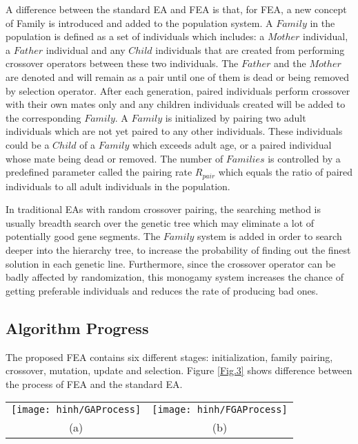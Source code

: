 \documentclass[final]{elsarticle}
\begin{document}
A difference between the standard EA and FEA is that, for FEA, a new concept of Family is introduced and added to the population system. A $ Family $ in the population is defined as a set of individuals which includes: a $ Mother $ individual, a $ Father $ individual and any $ Child $ individuals that are created from performing crossover operators between these two individuals. The $ Father $ and the $ Mother $ are denoted and will remain as a pair until one of them is dead or being removed by selection operator. After each generation, paired individuals perform crossover with their own mates only and any children individuals created will be added to the corresponding $ Family $. A $ Family $ is initialized by pairing two adult individuals which are not yet paired to any other individuals. These individuals could be a $ Child $ of a $ Family $ which exceeds adult age, or a paired individual whose mate being dead or removed. The number of $ Families $ is controlled by a predefined parameter called the pairing rate $R_{pair}$ which equals the ratio of paired individuals to all adult individuals in the population.

In traditional EAs with random crossover pairing, the searching method is usually breadth search over the genetic tree which may eliminate a lot of potentially good gene segments. The $ Family $ system is added in order to search deeper into the hierarchy tree, to increase the probability of finding out the finest solution in each genetic line. Furthermore, since the crossover operator can be badly affected by randomization, this monogamy system increases the chance of getting preferable individuals and reduces the rate of producing bad ones. 


\subsection{Algorithm Progress}

The proposed FEA contains six different stages: initialization, family pairing, crossover, mutation, update and selection. Figure \ref{Fig.3} shows difference between the process of FEA and the standard EA.
\begin{figure*}[h]
	\begin{tabular}{cc}
		\texttt{[image: hinh/GAProcess]}&\texttt{[image: hinh/FGAProcess]}\\
		(a)  &(b) \\
	\end{tabular}
	\centering
	\caption{The algorithm process of EA (a) and FEA (b)
	}
	\label{Fig.3}       %
\end{figure*}
\end{document}
